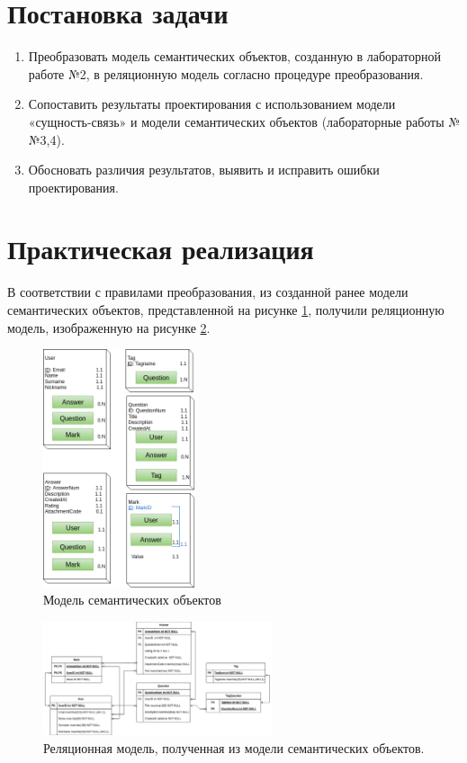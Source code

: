 \documentclass[a4paper, 14pt]{extarticle}
\begin{document}
\newpage




\section{Постановка задачи}

\begin{enumerate}
	\item{Преобразовать модель семантических объектов, созданную в лабораторной работе №2, в реляционную модель согласно процедуре преобразования.}
	\item{Сопоставить результаты проектирования с использованием модели «сущность-связь» и модели семантических объектов (лабораторные работы №№3,4).}
	\item{Обосновать различия результатов, выявить и исправить ошибки проектирования.}
\end{enumerate}

\newpage

\section{Практическая реализация}

В соответствии с правилами преобразования, из созданной ранее модели семантических объектов, представленной на рисунке \ref{fig:som_model}, получили реляционную модель, изображенную на  рисунке \ref{fig:relation_model_lab4}.

\begin{figure}[H]
\centering
\includegraphics[width=0.4\textwidth]{Diagram3} 
\caption{Модель семантических объектов} 
\label{fig:som_model}
\end{figure}


\begin{figure}[ht]
\centering
\includegraphics[width=0.6\textwidth]{Diagram1}
\caption{Реляционная модель, полученная из модели семантических объектов.} 
\label{fig:relation_model_lab4}
\end{figure}
\end{document}
